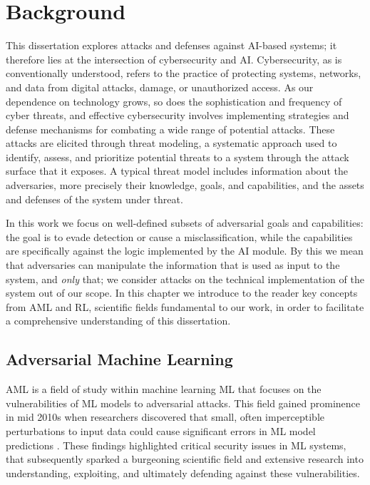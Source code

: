 \chapter{Background}\label{ch:background}
\label{ch:background}

This dissertation explores attacks and defenses against AI-based systems; it therefore lies at the intersection of cybersecurity and AI.
Cybersecurity, as is conventionally understood, refers to the practice of protecting systems, networks, and data from digital attacks, damage, or unauthorized access.
As our dependence on technology grows, so does the sophistication and frequency of cyber threats, and effective cybersecurity involves implementing strategies and defense mechanisms for combating a wide range of potential attacks.
These attacks are elicited through threat modeling, a systematic approach used to identify, assess, and prioritize potential threats to a system through the attack surface that it exposes.
A typical threat model includes information about the adversaries, more precisely their knowledge, goals, and capabilities, and the assets and defenses of the system under threat.

In this work we focus on well-defined subsets of adversarial goals and capabilities: the goal is to evade detection or cause a misclassification, while the capabilities are specifically against the logic implemented by the AI module.
By this we mean that adversaries can manipulate the information that is used as input to the system, and \textit{only} that; we consider attacks on the technical implementation of the system out of our scope.
In this chapter we introduce to the reader key concepts from \gls{AML} and \gls{RL}, scientific fields fundamental to our work, in order to facilitate a comprehensive understanding of this dissertation.

\section{Adversarial Machine Learning}
\gls{AML} is a field of study within machine learning \gls{ML} that focuses on the vulnerabilities of \gls{ML} models to adversarial attacks.
This field gained prominence in mid 2010s when researchers discovered that small, often imperceptible perturbations to input data could cause significant errors in ML model predictions \cite{biggio2013evasion, szegedy2013intriguing}.
These findings highlighted critical security issues in ML systems, that subsequently sparked a burgeoning scientific field and extensive research into understanding, exploiting, and ultimately defending against these vulnerabilities.

